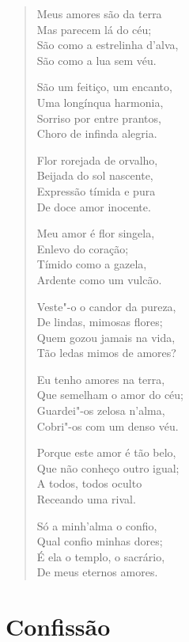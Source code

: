 \begin{verse}
Meus amores são da terra\\
Mas parecem lá do céu;\\
São como a estrelinha d'alva,\\
São como a lua sem véu.

São um feitiço, um encanto,\\
Uma longínqua harmonia,\\
Sorriso por entre prantos,\\
Choro de infinda alegria.

Flor rorejada de orvalho,\\
Beijada do sol nascente,\\
Expressão tímida e pura\\
De doce amor inocente.

Meu amor é flor singela,\\
Enlevo do coração;\\
Tímido como a gazela,\\
Ardente como um vulcão.

Veste"-o o candor da pureza,\\
De lindas, mimosas flores;\\
Quem gozou jamais na vida,\\
Tão ledas mimos de amores?

Eu tenho amores na terra,\\
Que semelham o amor do céu;\\
Guardei"-os zelosa n'alma,\\
Cobri"-os com um denso véu.

Porque este amor é tão belo,\\
Que não conheço outro igual;\\
A todos, todos oculto\\
Receando uma rival.

Só a minh'alma o confio,\\
Qual confio minhas dores;\\
É ela o templo, o sacrário,\\
De meus eternos amores.
\end{verse}

\chapter{Confissão}

